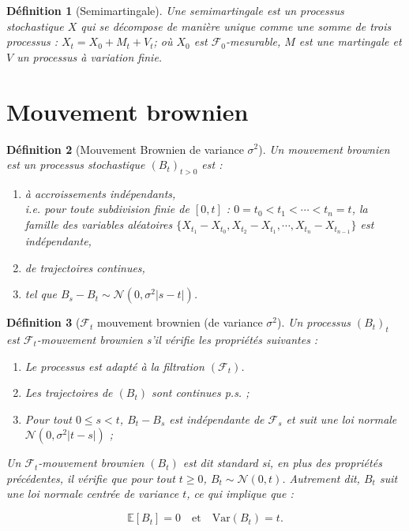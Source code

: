 \documentclass[openany]{book}
\newcommand{\F}{\mathscr{F}}
\theoremstyle{thmfont}
\theoremstyle{deffont}
\newtheorem{definition}[definition]{Définition}
\theoremstyle{thmfont}
\theoremstyle{deffont}
\begin{document}
\begin{definition}[Semimartingale] Une \textit{semimartingale} est un processus stochastique $X$ qui se décompose de manière unique comme une somme de trois processus : $X_t = X_0+ M_t + V_t$; où $X_0$ est $\F_0$-mesurable, $M$ est une martingale et $V$ un processus à variation finie.
\end{definition}

\section{Mouvement brownien}

\begin{definition}[Mouvement Brownien de variance $\sigma^2$] Un \textit{mouvement brownien} est un processus stochastique $(B_t)_{t>0}$ est :
  \begin{enumerate}
  \item à accroissements indépendants,\\
    i.e. pour toute subdivision finie de $[0,t]$ :  $0 = t_0 < t_1 < \cdots < t_n = t$, la famille des variables aléatoires
    $\{X_{t_1} - X_{t_0}, X_{t_2} - X_{t_1}, \cdots ,X_{t_n} - X_{t_{n-1}}\}$
    est indépendante,
  \item de trajectoires continues,
  \item tel que $B_s - B_t \sim \mathcal{N}(0,\sigma^2|s-t|)$.
  \end{enumerate}
\end{definition}

\begin{definition}[$\F_t$ mouvement brownien (de variance $\sigma^2$] Un processus $(B_t)_t$ est \textit{\( \mathcal{F}_t \)-mouvement brownien} s'il vérifie les propriétés suivantes :

  \begin{enumerate}
  \item Le processus est adapté à la filtration \( (\mathcal{F}_t) \).
  \item Les trajectoires de \( (B_t) \) sont continues p.s. ;
  \item Pour tout \( 0 \leq s < t \), \( B_t - B_s \) est indépendante de \( \mathcal{F}_s \) et suit une loi normale \( \mathcal{N}(0, \sigma^2|t - s|)\) ;
  \end{enumerate}

  Un \( \mathcal{F}_t \)-mouvement brownien \( (B_t) \) est dit \textit{standard} si, en plus des propriétés précédentes, il vérifie que pour tout \( t \geq 0 \), \(B_t \sim \mathcal{N}(0, t) \).
Autrement dit, \( B_t \) suit une loi normale centrée de variance \( t \), ce qui implique que :

\[
\mathbb{E}[B_t] = 0 \quad \text{et} \quad \text{Var}(B_t) = t.
\]
  \end{definition}
\end{document}
